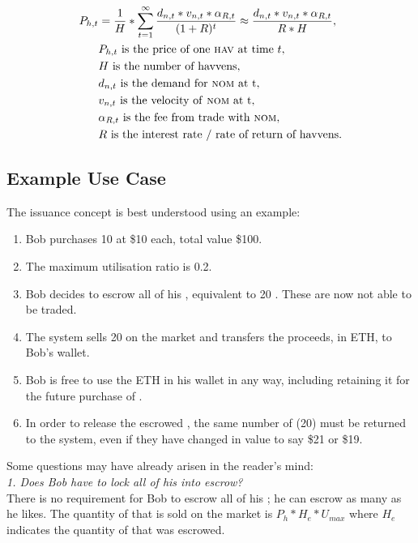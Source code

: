 \begin{align*} 
P_{h,t} &= \frac{1}{H}* \sum\limits_{t=1}^\infty \frac{d_{n,t} *v_{n,t} * \alpha_{R,t}}{(1+R)^t} \approx \frac{d_{n,t} *v_{n,t} * \alpha_{R,t}}{R * H}, \\
& P_{h,t} \text{ is the price of one \textsc{hav}{} at time } t, \\
& H \text{ is the number of havvens}, \\
& d_{n,t} \text{ is the demand for \textsc{nom}{} at t}, \\
& v_{n,t} \text{ is the velocity of \textsc{nom}{} at t}, \\
& \alpha_{R,t} \text{ is the fee from trade with \textsc{nom}{}}, \\
& R \text{ is the interest rate / rate of return of havvens}. \\
\end{align*}

\newpage

\subsection{Example Use Case}

\noindent The issuance concept is best understood using an example:
\begin{enumerate}
\item{Bob purchases 10 \HAV{} at \$10 each, total value \$100.}
\item{The maximum utilisation ratio is 0.2.}
\item{Bob decides to escrow all of his \HAV{}, equivalent to 20 \NOM{}. These \HAV{} are now not able to be traded.}
\item{The system sells 20 \NOM{} on the market and transfers the proceeds, in ETH, to Bob's wallet.}
\item{Bob is free to use the ETH in his wallet in any way, including retaining it for the future purchase of \NOM{}.}
\item{In order to release the escrowed \HAV{}, the same number of \NOM{} (20) must be returned to the system, even if they have changed in value to say \$21 or \$19.}
\end{enumerate} 

\noindent Some questions may have already arisen in the reader's mind: \\

\noindent \emph{1. Does Bob have to lock all of his \HAV{} into escrow?} \\ 

\noindent There is no requirement for Bob to escrow all of his \HAV{}; he can escrow as many as he likes. The quantity of \NOM{} that is sold on the market is $ P_h * H_e * U_{max} $ where $H_e$ indicates the quantity of \HAV{} that was escrowed. \\

